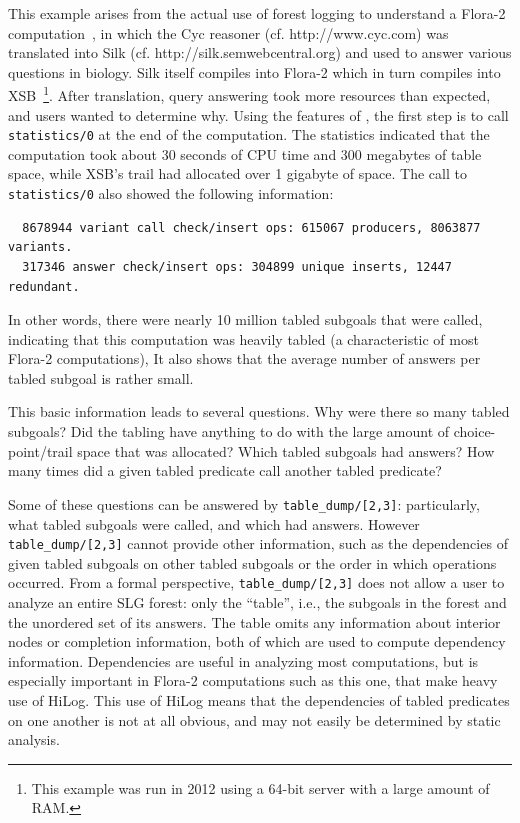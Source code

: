 \begin{example} \rm \label{ex:scc-anal}
%
This example arises from the actual use of forest logging to
understand a Flora-2 computation~\cite{YaKZ05}, in which the Cyc
reasoner (cf. http://www.cyc.com) was translated into Silk
(cf. http://silk.semwebcentral.org) and used to answer various
questions in biology.  Silk itself compiles into Flora-2 which in turn
compiles into XSB~\footnote{This example was run in 2012 using a
  64-bit server with a large amount of RAM.}.  After translation,
query answering took more resources than expected, and users wanted to
determine why.  Using the features of \version{}, the first step is to
call {\tt statistics/0} at the end of the computation.  The statistics
indicated that the computation took about 30 seconds of CPU time and
300 megabytes of table space, while XSB's trail had allocated over 1
gigabyte of space.  The call to {\tt statistics/0} also showed the
following information:
%
\begin{verbatim}
  8678944 variant call check/insert ops: 615067 producers, 8063877 variants.
  317346 answer check/insert ops: 304899 unique inserts, 12447 redundant.
\end{verbatim}
In other words, there were nearly 10 million tabled subgoals that were
called, indicating that this computation was heavily tabled (a
characteristic of most Flora-2 computations), It also shows that the
average number of answers per tabled subgoal is rather small.

This basic information leads to several questions.  Why were there so
many tabled subgoals?  Did the tabling have anything to do with the
large amount of choice-point/trail space that was allocated?  Which
tabled subgoals had answers?  How many times did a given tabled
predicate call another tabled predicate?

 Some of
these questions can be answered by {\tt table\_dump/[2,3]}:
particularly, what tabled subgoals were called, and which had answers.
However {\tt table\_dump/[2,3]} cannot provide other information, such
as the dependencies of given tabled subgoals on other tabled subgoals
or the order in which operations occurred.  From a formal perspective,
{\tt table\_dump/[2,3]} does not allow a user to analyze an entire SLG
forest: only the ``table'', i.e., the subgoals in the forest and the
unordered set of its answers.  The table omits any information about
interior nodes or completion information, both of which are used to
compute dependency information.  Dependencies are useful in analyzing
most computations, but is especially important in Flora-2 computations
such as this one, that make heavy use of HiLog.  This use of HiLog
means that the dependencies of tabled predicates on one another is not
at all obvious, and may not easily be determined by static analysis.


\end{example}
